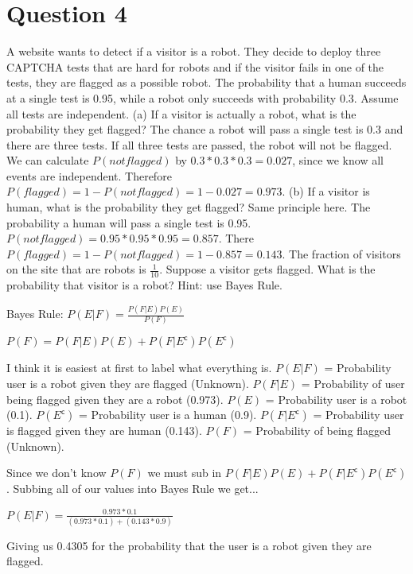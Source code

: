 \documentclass[12pt]{report}
\begin{document}
\section{Question 4}
A website wants to detect if a visitor is a robot. They decide to deploy three CAPTCHA tests that are hard for robots and if the visitor fails in one of the tests, they are flagged as a possible robot. The probability that a human succeeds at a single test is 0.95, while a robot only succeeds with probability 0.3. Assume all tests are independent.
\newline
\newline
(a) If a visitor is actually a robot, what is the probability they get flagged?
\newline
The chance a robot will pass a single test is 0.3 and there are three tests. If all three tests are passed, the robot will not be flagged. We can calculate $P(not flagged)$ by $0.3 * 0.3 * 0.3 = 0.027$, since we know all events are independent. Therefore $P(flagged) = 1 - P(not flagged) = 1 - 0.027 = 0.973$.
\newline
\newline
(b) If a visitor is human, what is the probability they get flagged?
\newline
Same principle here. The probability a human will pass a single test is 0.95. $P(not flagged) = 0.95 * 0.95 * 0.95 = 0.857$. There $P(flagged) = 1 - P(not flagged) = 1 - 0.857 = 0.143$.
\newline
\newline
The fraction of visitors on the site that are robots is $\frac{1}{10}$. Suppose a visitor gets flagged. What is the probability that visitor is a robot? Hint: use Bayes Rule.
\newline
\begin{center}
Bayes Rule: $P(E|F) = \frac{P(F|E)P(E)}{P(F)}$
\end{center}

\begin{center}
 $P(F) = P(F|E)P(E) + P(F|{E}^\mathsf{c})P({E}^\mathsf{c})$
\end{center}

I think it is easiest at first to label what everything is. 
\newline
$P(E|F)$ = Probability user is a robot given they are flagged (Unknown).
\newline
$P(F|E)$ = Probability of user being flagged given they are a robot (0.973).
\newline
$P(E)$ = Probability user is a robot (0.1).
\newline
$P(E^\mathsf{c})$ = Probability user is a human (0.9).
\newline
$P(F|E^\mathsf{c})$ = Probability user is flagged given they are human (0.143).
\newline
$P(F)$ = Probability of being flagged (Unknown).

Since we don't know $P(F)$ we must sub in $P(F|E)P(E) + P(F|{E}^\mathsf{c})P({E}^\mathsf{c})$. Subbing all of our values into Bayes Rule we get...
\begin{center}
$P(E|F) = \frac{0.973*0.1}{(0.973*0.1)+(0.143*0.9)}$
\end{center}
Giving us 0.4305 for the probability that the user is a robot given they are flagged.
\end{document}
